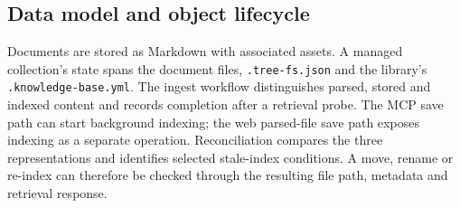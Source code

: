 \subsection{Data model and object lifecycle}
\label{sec:datamodel}
\label{sec:lifecycle}

Documents are stored as Markdown with associated assets. A managed
collection's state spans the document files, \texttt{.tree-fs.json} and the
library's \texttt{.knowledge-base.yml}. The ingest workflow distinguishes
parsed, stored and indexed content and records completion after a retrieval
probe. The MCP save path can start background indexing; the web parsed-file
save path exposes indexing as a separate operation. Reconciliation compares
the three representations and identifies selected stale-index conditions.
A move, rename or re-index can therefore be checked through the resulting
file path, metadata and retrieval response.
